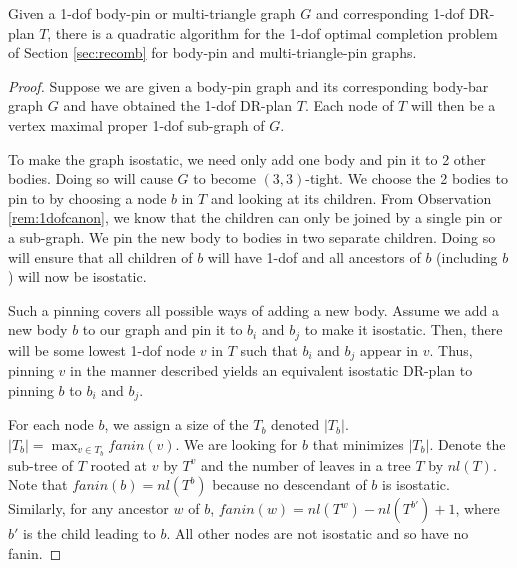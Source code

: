 \begin{theorem}
\label{thm:1dofcase}
    Given a 1-dof body-pin or multi-triangle graph $G$ and corresponding 1-dof DR-plan $T$, there is a quadratic algorithm for the 1-dof optimal completion problem of Section \ref{sec:recomb} for body-pin and multi-triangle-pin graphs.
\end{theorem}

\begin{proof}
    Suppose we are given a body-pin graph and its corresponding body-bar graph $G$ and have obtained the 1-dof DR-plan $T$. Each node of $T$ will then be a vertex maximal proper 1-dof sub-graph of $G$.

    To make the graph isostatic, we need only add one body and pin it to 2 other bodies. Doing so will cause $G$ to become $(3,3)$-tight. We choose the 2 bodies to pin to by choosing a node $b$ in $T$ and looking at its children. From Observation \ref{rem:1dofcanon}, we know that the children can only be joined by a single pin or a sub-graph. We pin the new body to bodies in two separate children. Doing so will ensure that all children of $b$ will have 1-dof and all ancestors of $b$ (including $b$) will now be isostatic.


    Such a pinning covers all possible ways of adding a new body. Assume we add a new body $b$ to our graph and pin it to $b_i$ and $b_j$ to make it isostatic. Then, there will be some lowest 1-dof node $v$ in $T$ such that $b_i$ and $b_j$ appear in $v$. Thus, pinning $v$ in the manner described yields an equivalent isostatic DR-plan to pinning $b$ to $b_i$ and $b_j$.

    For each node $b$, we assign a size of the $T_b$ denoted $|T_b|$. $|T_b| = \displaystyle\max_{v \in T_b} fanin(v)$. We are looking for $b$ that minimizes $|T_b|$. Denote the sub-tree of $T$ rooted at $v$ by $T^v$ and the number of leaves in a tree $T$ by $nl(T)$. Note that $fanin(b)= nl(T^b)$ because no descendant of $b$ is isostatic. Similarly, for any ancestor $w$ of $b$, $fanin(w) = nl(T^w)-nl(T^{b'})+1$, where $b'$ is the child leading to $b$. All other nodes are not isostatic and so have no fanin.


\end{proof}
